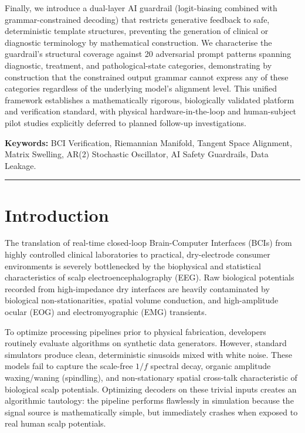\documentclass[11pt]{article}
\begin{document}
Finally, we introduce a dual-layer AI guardrail (logit-biasing combined with grammar-constrained decoding) that restricts generative feedback to safe, deterministic template structures, preventing the generation of clinical or diagnostic terminology by mathematical construction. We characterise the guardrail's structural coverage against 20 adversarial prompt patterns spanning diagnostic, treatment, and pathological-state categories, demonstrating by construction that the constrained output grammar cannot express any of these categories regardless of the underlying model's alignment level. This unified framework establishes a mathematically rigorous, biologically validated platform and verification standard, with physical hardware-in-the-loop and human-subject pilot studies explicitly deferred to planned follow-up investigations.

\vspace{0.5em}
\noindent\textbf{Keywords:} BCI Verification, Riemannian Manifold, Tangent Space Alignment, Matrix Swelling, AR(2) Stochastic Oscillator, AI Safety Guardrails, Data Leakage.

\vspace{1em}\hrule\vspace{1em}

\section{Introduction}

The translation of real-time closed-loop Brain-Computer Interfaces (BCIs) from highly controlled clinical laboratories to practical, dry-electrode consumer environments is severely bottlenecked by the biophysical and statistical characteristics of scalp electroencephalography (EEG). Raw biological potentials recorded from high-impedance dry interfaces are heavily contaminated by biological non-stationarities, spatial volume conduction, and high-amplitude ocular (EOG) and electromyographic (EMG) transients.

To optimize processing pipelines prior to physical fabrication, developers routinely evaluate algorithms on synthetic data generators. However, standard simulators produce clean, deterministic sinusoids mixed with white noise. These models fail to capture the scale-free $1/f$ spectral decay, organic amplitude waxing/waning (spindling), and non-stationary spatial cross-talk characteristic of biological scalp potentials. Optimizing decoders on these trivial inputs creates an algorithmic tautology: the pipeline performs flawlessly in simulation because the signal source is mathematically simple, but immediately crashes when exposed to real human scalp potentials.
\end{document}
